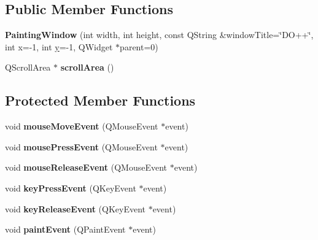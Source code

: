 \subsection*{Public Member Functions}
\begin{DoxyCompactItemize}
\item 
\hypertarget{class_d_o_1_1_painting_window_a7ea1bce9e0027f7fc48c1c138564d84c}{{\bfseries Painting\-Window} (int width, int height, const Q\-String \&window\-Title=\char`\"{}D\-O++\char`\"{}, int x=-\/1, int \hyperlink{group___channel_accessors_gac90c52c5b3a7b2a7e3761e6e84f25778}{y}=-\/1, Q\-Widget $\ast$parent=0)}\label{class_d_o_1_1_painting_window_a7ea1bce9e0027f7fc48c1c138564d84c}

\item 
\hypertarget{class_d_o_1_1_painting_window_ae1c14bcabfd3af8c71bb47964f7c5509}{Q\-Scroll\-Area $\ast$ {\bfseries scroll\-Area} ()}\label{class_d_o_1_1_painting_window_ae1c14bcabfd3af8c71bb47964f7c5509}

\end{DoxyCompactItemize}
\subsection*{Protected Member Functions}
\begin{DoxyCompactItemize}
\item 
\hypertarget{class_d_o_1_1_painting_window_ae820c6a86f0a1908bf451f86db043489}{void {\bfseries mouse\-Move\-Event} (Q\-Mouse\-Event $\ast$event)}\label{class_d_o_1_1_painting_window_ae820c6a86f0a1908bf451f86db043489}

\item 
\hypertarget{class_d_o_1_1_painting_window_ad2272e344e46519f026cd02f419884f1}{void {\bfseries mouse\-Press\-Event} (Q\-Mouse\-Event $\ast$event)}\label{class_d_o_1_1_painting_window_ad2272e344e46519f026cd02f419884f1}

\item 
\hypertarget{class_d_o_1_1_painting_window_a35226f6549add1ff837c65888fcd00fc}{void {\bfseries mouse\-Release\-Event} (Q\-Mouse\-Event $\ast$event)}\label{class_d_o_1_1_painting_window_a35226f6549add1ff837c65888fcd00fc}

\item 
\hypertarget{class_d_o_1_1_painting_window_adf2e9d5e456a754a5459e8435b0b094b}{void {\bfseries key\-Press\-Event} (Q\-Key\-Event $\ast$event)}\label{class_d_o_1_1_painting_window_adf2e9d5e456a754a5459e8435b0b094b}

\item 
\hypertarget{class_d_o_1_1_painting_window_a9e0db194f0850420e6bf556d821e6080}{void {\bfseries key\-Release\-Event} (Q\-Key\-Event $\ast$event)}\label{class_d_o_1_1_painting_window_a9e0db194f0850420e6bf556d821e6080}

\item 
\hypertarget{class_d_o_1_1_painting_window_accfb24f32254fb98c049727597a53956}{void {\bfseries paint\-Event} (Q\-Paint\-Event $\ast$event)}\label{class_d_o_1_1_painting_window_accfb24f32254fb98c049727597a53956}

\end{DoxyCompactItemize}


